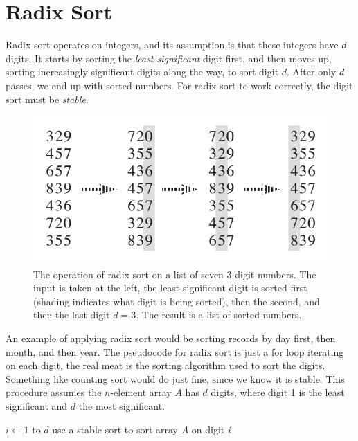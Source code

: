 \documentclass{article}
\begin{document}
\newpage

\section*{Radix Sort}
Radix sort operates on integers, and its assumption is that these integers have $d$ digits. It starts by sorting the \textit{least significant} digit first, and then moves up, sorting increasingly significant digits along the way, to sort digit $d$. After only $d$ passes, we end up with sorted numbers. For radix sort to work correctly, the digit sort must be \textit{stable}.

\begin{figure}[!ht]
\includegraphics[scale=0.4]{radix_sort}
\caption{
    The operation of radix sort on a list of seven 3-digit numbers. The input is taken at the left, the least-significant digit is sorted first (shading indicates what digit is being sorted), then the second, and then the last digit $d=3$. The result is a list of sorted numbers.
}
\label{fig:linear_rs}
\end{figure}

An example of applying radix sort would be sorting records by day first, then month, and then year. The pseudocode for radix sort is just a for loop iterating on each digit, the real meat is the sorting algorithm used to sort the digits. Something like counting sort would do just fine, since we know it is stable. This procedure assumes the $n$-element array $A$ has $d$ digits, where digit 1 is the least significant and $d$ the most significant.

\begin{codebox}
\li \For $i \gets 1$ to $d$
\li \Do
        use a stable sort to sort array $A$ on digit $i$
    \End
\end{codebox}
\end{document}
